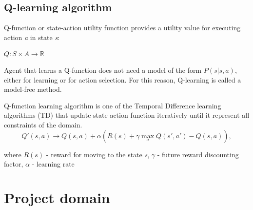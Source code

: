 \documentclass[12pt]{article}
\begin{document}
\subsection{Q-learning algorithm}{
Q-function or state-action utility function provides a utility value for executing action \textit{a} in state \textit{s}:
\begin{center}
$Q:S \times A \to \mathbb{R}$
\end{center}
Agent that learns a Q-function does not need a model of the form $P(s | s, a)$, either for learning or for action selection. For this reason, Q-learning is called a model-free method.\par
Q-function learning algorithm is one of the Temporal Difference learning algorithms (TD) that update state-action function iteratively until it represent all constraints of the domain.
\begin{equation} 
\label{q_update}
Q'(s, a) \rightarrow Q(s, a) + \alpha (R(s) + \gamma \max\limits_a Q(s', a') − Q(s, a)),
\end{equation}

where $R(s)$ - reward for moving to the state \textit{s}, $\gamma$ - future reward discounting factor, $\alpha$ - learning rate
}
\newpage
\section{Project domain} 
\end{document}
